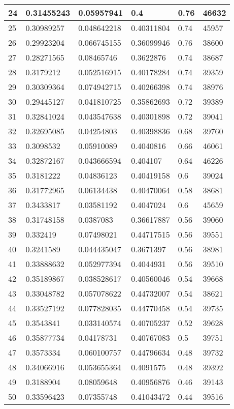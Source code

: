\begin{longtable}{|l|l|l|l|l|l|}
24 & 0.31455243 & 0.05957941 & 0.4 & 0.76 & 46632 \\ \hline 
25 & 0.30989257 & 0.048642218 & 0.40311804 & 0.74 & 45957 \\ \hline 
26 & 0.29923204 & 0.066745155 & 0.36099946 & 0.76 & 38600 \\ \hline 
27 & 0.28271565 & 0.08465746 & 0.3622876 & 0.74 & 38687 \\ \hline 
28 & 0.3179212 & 0.052516915 & 0.40178284 & 0.74 & 39359 \\ \hline 
29 & 0.30309364 & 0.074942715 & 0.40266398 & 0.74 & 38976 \\ \hline 
30 & 0.29445127 & 0.041810725 & 0.35862693 & 0.72 & 39389 \\ \hline 
31 & 0.32841024 & 0.043547638 & 0.40301898 & 0.72 & 39041 \\ \hline 
32 & 0.32695085 & 0.04254803 & 0.40398836 & 0.68 & 39760 \\ \hline 
33 & 0.3098532 & 0.05910089 & 0.4040816 & 0.66 & 46061 \\ \hline 
34 & 0.32872167 & 0.043666594 & 0.404107 & 0.64 & 46226 \\ \hline 
35 & 0.3181222 & 0.04836123 & 0.40419158 & 0.6 & 39024 \\ \hline 
36 & 0.31772965 & 0.06134438 & 0.40470064 & 0.58 & 38681 \\ \hline 
37 & 0.3433817 & 0.03581192 & 0.4047024 & 0.6 & 45659 \\ \hline 
38 & 0.31748158 & 0.0387083 & 0.36617887 & 0.56 & 39060 \\ \hline 
39 & 0.332419 & 0.07498021 & 0.44717515 & 0.56 & 39551 \\ \hline 
40 & 0.3241589 & 0.044435047 & 0.3671397 & 0.56 & 38981 \\ \hline 
41 & 0.33888632 & 0.052977394 & 0.4044931 & 0.56 & 39510 \\ \hline 
42 & 0.35189867 & 0.038528617 & 0.40560046 & 0.54 & 39668 \\ \hline 
43 & 0.33048782 & 0.057078622 & 0.44732007 & 0.54 & 38621 \\ \hline 
44 & 0.33527192 & 0.077828035 & 0.44770458 & 0.54 & 39735 \\ \hline 
45 & 0.3543841 & 0.033140574 & 0.40705237 & 0.52 & 39628 \\ \hline 
46 & 0.35877734 & 0.04178731 & 0.40767083 & 0.5 & 39751 \\ \hline 
47 & 0.3573334 & 0.060100757 & 0.44796634 & 0.48 & 39732 \\ \hline 
48 & 0.34066916 & 0.053655364 & 0.4091575 & 0.48 & 39392 \\ \hline 
49 & 0.3188904 & 0.08059648 & 0.40956876 & 0.46 & 39143 \\ \hline 
50 & 0.33596423 & 0.07355748 & 0.41043472 & 0.44 & 39516 \\ \hline 
\end{longtable}